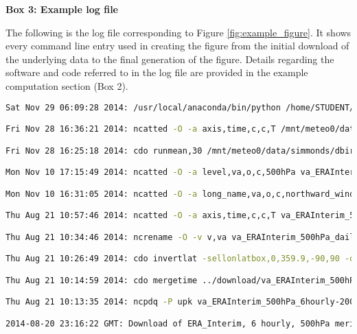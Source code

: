 \textbf{Box 3: Example log file}

The following is the log file corresponding to Figure \ref{fig:example_figure}. It shows every command line entry used in creating the figure from the initial download of the underlying data to the final generation of the figure. Details regarding the software and code referred to in the log file are provided in the example computation section (Box 2).

\begin{lstlisting}[language=bash] 
Sat Nov 29 06:09:28 2014: /usr/local/anaconda/bin/python /home/STUDENT/dbirving/phd/visualisation/plot_hilbert.py /mnt/meteo0/data/simmonds/dbirving/ERAInterim/data/va_ERAInterim_500hPa_030day-runmean_native.nc va hilbert_zw3_w19_va_ERAInterim_500hPa_030day-runmean_native-55S_1986-05-22_2006-07-29.png 1 2 --latitude -55 --dates 1986-05-22 2006-07-29 --wavenumbers 1 9 --figure_size 15 6 (Git hash: 8a42fff) 

Fri Nov 28 16:36:21 2014: ncatted -O -a axis,time,c,c,T /mnt/meteo0/data/simmonds/dbirving/ERAInterim/data/va_ERAInterim_500hPa_030day-runmean_native.nc

Fri Nov 28 16:25:18 2014: cdo runmean,30 /mnt/meteo0/data/simmonds/dbirving/ERAInterim/data/va_ERAInterim_500hPa_daily_native.nc /mnt/meteo0/data/simmonds/dbirving/ERAInterim/data/va_ERAInterim_500hPa_030day-runmean_native.nc

Mon Nov 10 17:15:49 2014: ncatted -O -a level,va,o,c,500hPa va_ERAInterim_500hPa_daily_native.nc

Mon Nov 10 16:31:05 2014: ncatted -O -a long_name,va,o,c,northward_wind va_ERAInterim_500hPa_daily_native.nc

Thu Aug 21 10:57:46 2014: ncatted -O -a axis,time,c,c,T va_ERAInterim_500hPa_daily_native.nc

Thu Aug 21 10:34:46 2014: ncrename -O -v v,va va_ERAInterim_500hPa_daily_native.nc

Thu Aug 21 10:26:49 2014: cdo invertlat -sellonlatbox,0,359.9,-90,90 -daymean va_ERAInterim_500hPa_6hourly_native.nc va_ERAInterim_500hPa_daily_native.nc

Thu Aug 21 10:14:59 2014: cdo mergetime ../download/va_ERAInterim_500hPa_6hourly-1979-1988_native_unpacked.nc ../download/va_ERAInterim_500hPa_6hourly-1989-1998_native_unpacked.nc ../download/va_ERAInterim_500hPa_6hourly-1999-2008_native_unpacked.nc ../download/va_ERAInterim_500hPa_6hourly-2009-2014_native_unpacked.nc va_ERAInterim_500hPa_6hourly_native.nc 

Thu Aug 21 10:13:35 2014: ncpdq -P upk va_ERAInterim_500hPa_6hourly-2009-2014_native.nc va_ERAInterim_500hPa_6hourly-2009-2014_native_unpacked.nc

2014-08-20 23:16:22 GMT: Download of ERA_Interim, 6 hourly, 500hPa meridional wind (va) data 
\end{lstlisting}

